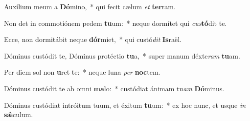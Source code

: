 \item Auxílium meum a \textbf{Dó}mino,~* qui fecit cælum \textit{et} \textbf{ter}ram.
\item Non det in commotiónem pedem \textbf{tu}um:~* neque dormítet qui \textit{cus}\textbf{tó}dit te.
\item Ecce, non dormitábit neque \textbf{dór}miet,~* qui custó\textit{dit} \textbf{Is}raël.
\item Dóminus custódit te, Dóminus protéctio \textbf{tu}a,~* super manum déxte\textit{ram} \textbf{tu}am.
\item Per diem sol non \textbf{u}ret te:~* neque luna \textit{per} \textbf{noc}tem.
\item Dóminus custódit te ab omni \textbf{ma}lo:~* custódiat ánimam tu\textit{am} \textbf{Dó}minus.
\item Dóminus custódiat intróitum tuum, et éxitum \textbf{tu}um:~* ex hoc nunc, et usque \textit{in} \textbf{sǽ}culum.
